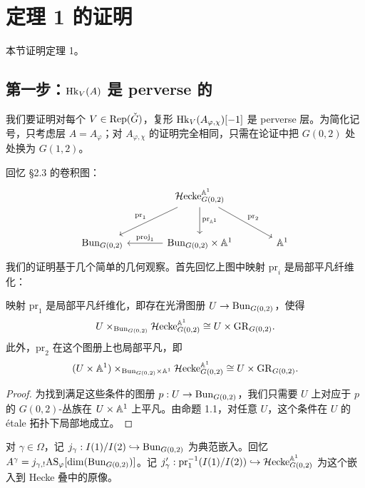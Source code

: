 
\section{定理 1 的证明}

本节证明定理 1。

\subsection{第一步：$\mathrm{Hk}_V(A)$ 是 perverse 的}

我们要证明对每个 $V\in\mathrm{Rep}(\check G)$，复形 $\mathrm{Hk}_V(A_{\varphi,\chi})[-1]$ 是 perverse 层。为简化记号，只考虑层 $A=A_\varphi$；对 $A_{\varphi,\chi}$ 的证明完全相同，只需在论证中把 $G(0,2)$ 处处换为 $G(1,2)$。

回忆 §2.3 的卷积图：
\[
\begin{tikzcd}[column sep=large, row sep=large]
& \Hecke^{\Aff^1}_{G(0,2)} \arrow[dl, "\mathrm{pr}_1"'] \arrow[dr, "\mathrm{pr}_2"] \arrow[d, "\mathrm{pr}_{\Aff^1}"] & \\
\Bun_{G(0,2)} & \Bun_{G(0,2)}\times\Aff^1 \arrow[l, "\mathrm{proj}_1"'] & \Aff^1
\end{tikzcd}
\]
我们的证明基于几个简单的几何观察。首先回忆上图中映射 $\mathrm{pr}_i$ 是局部平凡纤维化：

\begin{remark}
映射 $\mathrm{pr}_1$ 是局部平凡纤维化，即存在光滑图册 $U\to\mathrm{Bun}_{G(0,2)}$，使得
\[
U\times_{\mathrm{Bun}_{G(0,2)}}\mathcal{H}\mathrm{ecke}^{\mathbb{A}^1}_{G(0,2)}\cong U\times\mathrm{GR}_{G(0,2)}.
\]
此外，$\mathrm{pr}_2$ 在这个图册上也局部平凡，即
\[
(U\times\mathbb{A}^1)\times_{\mathrm{Bun}_{G(0,2)}\times\mathbb{A}^1}\mathcal{H}\mathrm{ecke}^{\mathbb{A}^1}_{G(0,2)}\cong U\times\mathrm{GR}_{G(0,2)}.
\]
\end{remark}

\begin{proof}
为找到满足这些条件的图册 $p:U\to\mathrm{Bun}_{G(0,2)}$，我们只需要 $U$ 上对应于 $p$ 的 $G(0,2)$-丛族在 $U\times\mathbb{A}^1$ 上平凡。由命题 1.1，对任意 $U$，这个条件在 $U$ 的 étale 拓扑下局部地成立。
\end{proof}

对 $\gamma\in\Omega$，记 $j_\gamma:I(1)/I(2)\hookrightarrow\mathrm{Bun}_{G(0,2)}$ 为典范嵌入。回忆 $A^\gamma=j_{\gamma,!}\mathrm{AS}_\varphi[\dim(\mathrm{Bun}_{G(0,2)})]$。记 $j'_\gamma:\mathrm{pr}_1^{-1}(I(1)/I(2))\hookrightarrow\mathcal{H}\mathrm{ecke}^{\mathbb{A}^1}_{G(0,2)}$ 为这个嵌入到 Hecke 叠中的原像。

